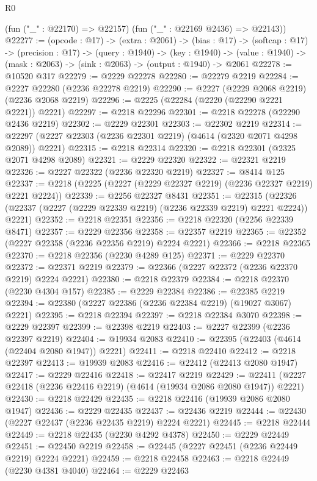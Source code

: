 \begin{lexlean}{R0}
\begin{coremodule}
      (fun ("_" : @22170) => @22157)
      (fun ("_" : @22169 @2436) => @22143))
@22277 := (opcode : @17) ->
  (extra : @2061) ->
  (bias : @17) ->
  (softcap : @17) ->
  (precision : @17) ->
  (query : @1940) ->
  (key : @1940) -> (value : @1940) -> (mask : @2063) -> (sink : @2063) -> (output : @1940) -> @2061
@22278 := @10520 @317
@22279 := @2229 @22278
@22280 := @22279 @2219
@22284 := @2227 @22280 (@2236 @22278 @2219)
@22290 := @2227 (@2229 @2068 @2219) (@2236 @2068 @2219)
@22296 := @2225 (@22284 (@2220 (@22290 @2221 @2221)) @2221)
@22297 := @2218 @22296
@22301 := @2218 @22278 (@22290 @2436 @2219)
@22302 := @2229 @22301
@22303 := @22302 @2219
@22314 := @22297 (@2227 @22303 (@2236 @22301 @2219) (@4614 (@2320 @2071 @4298 @2089)) @2221)
@22315 := @2218 @22314
@22320 := @2218 @22301 (@2325 @2071 @4298 @2089)
@22321 := @2229 @22320
@22322 := @22321 @2219
@22326 := @2227 @22322 (@2236 @22320 @2219)
@22327 := @8414 @125
@22337 := @2218 (@2225 (@2227 (@2229 @22327 @2219) (@2236 @22327 @2219) @2221 @2224))
@22339 := @2256 @22327 @8431
@22351 := @22315
    (@22326 (@22337 (@2227 (@2229 @22339 @2219) (@2236 @22339 @2219) @2221 @2224)) @2221)
@22352 := @2218 @22351
@22356 := @2218 @22320 (@2256 @22339 @8471)
@22357 := @2229 @22356
@22358 := @22357 @2219
@22365 := @22352 (@2227 @22358 (@2236 @22356 @2219) @2224 @2221)
@22366 := @2218 @22365
@22370 := @2218 @22356 (@2230 @4289 @125)
@22371 := @2229 @22370
@22372 := @22371 @2219
@22379 := @22366 (@2227 @22372 (@2236 @22370 @2219) @2224 @2221)
@22380 := @2218 @22379
@22384 := @2218 @22370 (@2230 @4304 @157)
@22385 := @2229 @22384
@22386 := @22385 @2219
@22394 := @22380 (@2227 @22386 (@2236 @22384 @2219) (@19027 @3067) @2221)
@22395 := @2218 @22394
@22397 := @2218 @22384 @3070
@22398 := @2229 @22397
@22399 := @22398 @2219
@22403 := @2227 @22399 (@2236 @22397 @2219)
@22404 := @19934 @2083
@22410 := @22395 (@22403 (@4614 (@22404 @2080 @1947)) @2221)
@22411 := @2218 @22410
@22412 := @2218 @22397
@22413 := @19939 @2083
@22416 := @22412 (@22413 @2080 @1947)
@22417 := @2229 @22416
@22418 := @22417 @2219
@22429 := @22411 (@2227 @22418 (@2236 @22416 @2219) (@4614 (@19934 @2086 @2080 @1947)) @2221)
@22430 := @2218 @22429
@22435 := @2218 @22416 (@19939 @2086 @2080 @1947)
@22436 := @2229 @22435
@22437 := @22436 @2219
@22444 := @22430 (@2227 @22437 (@2236 @22435 @2219) @2224 @2221)
@22445 := @2218 @22444
@22449 := @2218 @22435 (@2230 @4292 @4378)
@22450 := @2229 @22449
@22451 := @22450 @2219
@22458 := @22445 (@2227 @22451 (@2236 @22449 @2219) @2224 @2221)
@22459 := @2218 @22458
@22463 := @2218 @22449 (@2230 @4381 @4040)
@22464 := @2229 @22463

\end{coremodule}
\end{lexlean}
